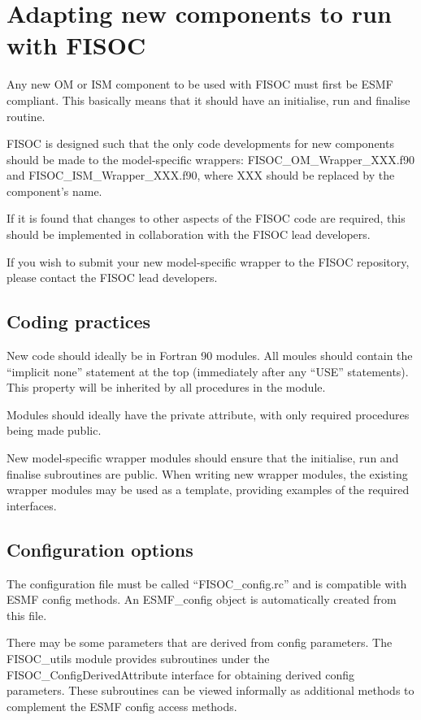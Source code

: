 \documentclass[12pt]{article}
\begin{document}
\section{Adapting new components to run with  FISOC}
\label{sec:FISOC_SDG}

Any new OM or ISM component to be used with FISOC must first be ESMF compliant.  This basically 
means that it should have an initialise, run and finalise routine. 

FISOC is designed such that the only code developments for new components should be made to the 
model-specific wrappers: FISOC\_OM\_Wrapper\_XXX.f90 and FISOC\_ISM\_Wrapper\_XXX.f90, where 
XXX should be replaced by the component's name.

If it is found that changes to other aspects of the FISOC code are required, this should be 
implemented in collaboration with the FISOC lead developers.

If you wish to submit your new model-specific wrapper to the FISOC repository, please contact 
the FISOC lead developers.


\subsection{Coding practices}

New code should ideally be in Fortran 90 modules.  
All moules should contain the ``implicit none'' statement at the top (immediately after any 
``USE'' statements).  This property will be inherited by all procedures in the module.

Modules should ideally have the private attribute, with only required procedures being 
made public. 

New model-specific wrapper modules should ensure that the initialise, run and finalise 
subroutines are public. 
When writing new wrapper modules, the existing wrapper modules may be used as a template, 
providing examples of the required interfaces.


\subsection{Configuration options}

The configuration file must be called ``FISOC\_config.rc'' and is compatible with ESMF 
config methods.  
An ESMF\_config object is automatically created from this file.

There may be some parameters that are derived from config parameters.  
The FISOC\_utils module provides subroutines under the 
FISOC\_ConfigDerivedAttribute interface 
for obtaining derived config parameters.
These subroutines can be viewed informally as additional methods to complement the ESMF config access methods. 
\end{document}
